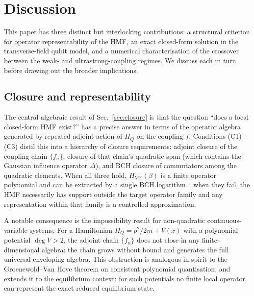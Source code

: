 \section{Discussion}
\label{sec:discussion}

This paper has three distinct but interlocking contributions: a structural
criterion for operator representability of the HMF, an exact closed-form
solution in the transverse-field qubit model, and a numerical characterisation
of the crossover between the weak- and ultrastrong-coupling regimes.
We discuss each in turn before drawing out the broader implications.

\subsection*{Closure and representability}

The central algebraic result of Sec.~\ref{sec:closure} is that the question
``does a local closed-form HMF exist?'' has a precise answer in terms of the
operator algebra generated by repeated adjoint action of $H_Q$ on the coupling
$f$.
Conditions (C1)--(C3) distil this into a hierarchy of closure requirements:
adjoint closure of the coupling chain $\{f_n\}$, closure of that chain's
quadratic span (which contains the Gaussian influence operator $\Delta$),
and BCH closure of commutators among the quadratic elements.
When all three hold, $H_{\mathrm{MF}}(\beta)$ is a finite operator polynomial
and can be extracted by a single BCH
logarithm~\cite{magnusExponentialSolutionDifferential1954a,blanesMagnusExpansionIts2009,weiLieAlgebraicSolution1963,vanbruntVisser2015BCHClosedForms};
when they fail, the
HMF necessarily has support outside the target operator family and any
representation within that family is a controlled approximation.

A notable consequence is the impossibility result for non-quadratic
continuous-variable systems.
For a Hamiltonian $H_Q = p^2/2m + V(x)$ with a polynomial potential
$\deg V > 2$, the adjoint chain $\{f_n\}$ does not close in any
finite-dimensional algebra: the chain grows without bound and generates
the full universal enveloping algebra.
This obstruction is analogous in spirit to the Groenewold--Van Hove theorem
on consistent polynomial quantisation, and extends it to the equilibrium
context: for such potentials no finite local operator can
represent the exact reduced equilibrium state.

